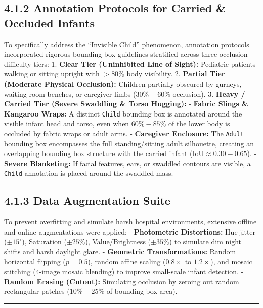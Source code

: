 \subsection{4.1.2 Annotation Protocols for Carried \& Occluded
Infants}\label{annotation-protocols-for-carried-occluded-infants}

To specifically address the ``Invisible Child'' phenomenon, annotation
protocols incorporated rigorous bounding box guidelines stratified
across three occlusion difficulty tiers: 1. \textbf{Clear Tier
(Uninhibited Line of Sight):} Pediatric patients walking or sitting
upright with \(>80\%\) body visibility. 2. \textbf{Partial Tier
(Moderate Physical Occlusion):} Children partially obscured by gurneys,
waiting room benches, or caregiver limbs (\(30\% - 60\%\) occlusion). 3.
\textbf{Heavy / Carried Tier (Severe Swaddling \& Torso Hugging):} -
\textbf{Fabric Slings \& Kangaroo Wraps:} A distinct \texttt{Child}
bounding box is annotated around the visible infant head and torso, even
when \(60\% - 85\%\) of the lower body is occluded by fabric wraps or
adult arms. - \textbf{Caregiver Enclosure:} The \texttt{Adult} bounding
box encompasses the full standing/sitting adult silhouette, creating an
overlapping bounding box structure with the carried infant
(\(\text{IoU} \approx 0.30 - 0.65\)). - \textbf{Severe Blanketing:} If
facial features, ears, or swaddled contours are visible, a
\texttt{Child} annotation is placed around the swaddled mass.

\subsection{4.1.3 Data Augmentation
Suite}\label{data-augmentation-suite}

To prevent overfitting and simulate harsh hospital environments,
extensive offline and online augmentations were applied: -
\textbf{Photometric Distortions:} Hue jitter (\(\pm 15^\circ\)),
Saturation (\(\pm 25\%\)), Value/Brightness (\(\pm 35\%\)) to simulate
dim night shifts and harsh daylight glare. - \textbf{Geometric
Transformations:} Random horizontal flipping (\(p=0.5\)), random affine
scaling (\(0.8\times \text{ to } 1.2\times\)), and mosaic stitching
(\(4\text{-image mosaic blending}\)) to improve small-scale infant
detection. - \textbf{Random Erasing (Cutout):} Simulating occlusion by
zeroing out random rectangular patches (\(10\% - 25\%\) of bounding box
area).

\begin{center}\rule{0.5\linewidth}{0.5pt}\end{center}


